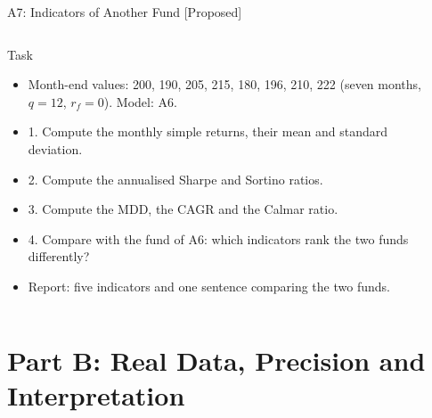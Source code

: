 \begin{frame}{A7: Indicators of Another Fund [Proposed]}
\propsub
\itemsize{\footnotesize}
\begin{columns}[T]
\begin{column}{\taskw}
\begin{block}{Task}
\begin{itemize}
    \item Month-end values: 200, 190, 205, 215, 180, 196, 210, 222 (seven months, $q = 12$, $r_f = 0$). Model: A6.
    \item 1. Compute the monthly simple returns, their mean and standard deviation.
    \item 2. Compute the annualised Sharpe and Sortino ratios.
    \item 3. Compute the MDD, the CAGR and the Calmar ratio.
    \item 4. Compare with the fund of A6: which indicators rank the two funds differently?
    \item Report: five indicators and one sentence comparing the two funds.
\end{itemize}
\end{block}
\end{column}
\begin{column}{\solw}
\end{column}
\end{columns}
\end{frame}


\section{Part B: Real Data, Precision and Interpretation}

